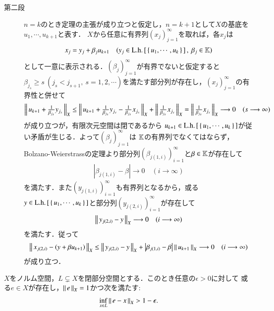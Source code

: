 \begin{prf}
\begin{description}
			\item[第二段]
				$n=k$のとき定理の主張が成り立つと仮定し，$n = k+1$として$X$の基底を$u_1,\cdots,u_{k+1}$と表す．
				$X$から任意に有界列$(x_j)_{j=1}^{\infty}$を取れば，各$x_j$は
				\begin{align}
					x_j = y_j + \beta_j u_{k+1} \quad (y_j \in \mathrm{L.h.}\left[\, \left\{\, u_1,\cdots,u_k\, \right\}\, \right],\ \beta_j \in \mathbb{K})
				\end{align}
				として一意に表示される．$(\beta_j)_{j=1}^{\infty}$が有界でないと仮定すると
				$\beta_{j_s} \geq s\ (j_s < j_{s+1},\ s=1,2,\cdots)$を満たす部分列が存在し，$(x_j)_{j=1}^{\infty}$の有界性と併せて
				\begin{align}
					\left\|\, u_{k+1} + \tfrac{1}{\beta_{j_s}}y_{j_s}\, \right\|_{X}
					\leq \left\|\, u_{k+1} + \tfrac{1}{\beta_{j_s}}y_{j_s} - \tfrac{1}{\beta_{j_s}}x_{j_s}\, \right\|_{X}
						+ \left\|\, \tfrac{1}{\beta_{j_s}}x_{j_s}\, \right\|_{X}
					= \left\|\, \tfrac{1}{\beta_{j_s}}x_{j_s}\, \right\|_{X} \longrightarrow 0 \quad (s \longrightarrow \infty)
				\end{align}
				が成り立つが，有限次元空間は閉であるから
				$u_{k+1} \in \mathrm{L.h.}\left[\, \left\{\, u_1,\cdots,u_k\, \right\}\, \right]$が従い矛盾が生じる．よって$(\beta_j)_{j=1}^{\infty}$は
				$\mathbb{K}$の有界列でなくてはならず，Bolzano-Weierstrassの定理より部分列$\left( \beta_{j(1,i)} \right)_{i=1}^{\infty}$と$\beta \in \mathbb{K}$が存在して
				\begin{align}
					\left| \beta_{j(1,i)} - \beta \right| \longrightarrow 0 \quad (i \longrightarrow \infty)
				\end{align}
				を満たす．また$\left(y_{j(1,i)}\right)_{i=1}^{\infty}$も有界列となるから，或る
				$y \in \mathrm{L.h.}\left[\, \left\{\, u_1,\cdots,u_k\, \right\}\, \right]$と部分列$\left(y_{j(2,i)}\right)_{i=1}^{\infty}$が存在して
				\begin{align}
					\left\|\, y_{j(2,i)} - y\, \right\|_{X} \longrightarrow 0 \quad (i \longrightarrow \infty)
				\end{align}
				を満たす．従って
				\begin{align}
					\left\|\, x_{j(2,i)} - \left(y + \beta u_{k+1}\right)\, \right\|_{X} \leq
					\left\|\, y_{j(2,i)} - y\, \right\|_{X} + \left| \beta_{j(1,i)} - \beta \right| \left\|\, u_{k+1}\, \right\|_{X}
					\longrightarrow 0 \quad (i \longrightarrow \infty)
				\end{align}
				が成り立つ．
				\QED
		\end{description}
	\end{prf}
	
	\begin{screen}
		\begin{thm}[閉部分空間との点の距離]
			$X$をノルム空間，$L \subsetneq X$を閉部分空間とする．このとき任意の$\epsilon > 0$に対して
			或る$e \in X$が存在し，$\left\|\, e\, \right\|_{X} = 1$かつ次を満たす:
			\begin{align}
				\operatorname*{inf}_{x \in L} \left\|\, e - x\, \right\|_{X} > 1 - \epsilon.
			\end{align}
			\label{thm:closed_subspace_distance}
		\end{thm}
	\end{screen}
	
